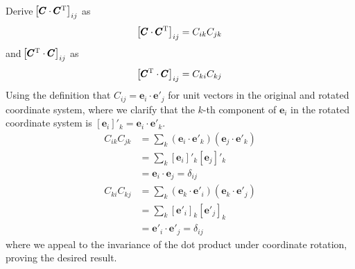 \documentclass[a4paper]{article}
\begin{document}

Derive \( \!\left[ \pmb{C} \cdot \pmb{C}^{\textsc{T}} \right]_{ij} \)  as 
\[
	\!\left[ \pmb{C} \cdot \pmb{C}^{\textsc{T}} \right]_{ij} = C_{ik}C_{jk} 
\]
and \( \!\left[ \pmb{C}^{\textsc{T}} \cdot \pmb{C} \right]_{ij} \) as 
\[
	\!\left[ \pmb{C}^{\textsc{T}} \cdot \pmb{C} \right]_{ij} = C_{ki}C_{kj} 
\]
Using the definition that \( C_{ij} = \pmb{e}_{i} \cdot \pmb{e}'_{j} \) for unit vectors in the original and rotated coordinate system, where we clarify that the \( k \)-th component of \( \pmb{e}_{i} \) in the rotated coordinate system is \( \!\left[ \pmb{e}_{i} \right]'_{k} = \pmb{e}_{i} \cdot \pmb{e}'_{k} \).
\begin{align*}
	C_{ik}C_{jk} & = \sum_{k} \!\left( \pmb{e}_{i} \cdot \pmb{e}'_{k} \right)\!\left( \pmb{e}_{j} \cdot \pmb{e}'_{k} \right) \\
		     & = \sum_{k} \!\left[ \pmb{e}_{i} \right]'_{k}\!\left[ \pmb{e}_{j} \right]'_{k} \\
		     & = \pmb{e}_{i} \cdot \pmb{e}_{j} = \delta_{ij} \\
	C_{ki}C_{kj} & = \sum_{k} \!\left( \pmb{e}_{k} \cdot \pmb{e}'_{i} \right)\!\left( \pmb{e}_{k} \cdot \pmb{e}'_{j} \right) \\
		     & = \sum_{k}\!\left[ \pmb{e}'_{i} \right]_{k}\!\left[ \pmb{e}'_{j} \right]_{k} \\
		     & = \pmb{e}'_{i} \cdot \pmb{e}'_{j} = \delta_{ij}
\end{align*}
where we appeal to the invariance of the dot product under coordinate rotation, proving the desired result.

\vspace{12pt}
\end{document}
